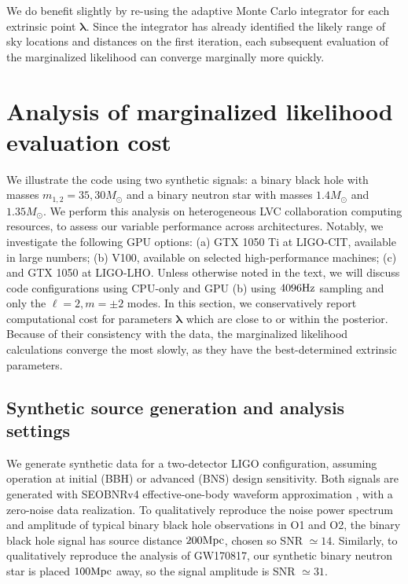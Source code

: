 \documentclass[twocolumn,prd,nofootinbib]{revtex4}
\newcommand\unit[1]{{\rm #1}}
\begin{document}
We do benefit slightly by re-using the adaptive Monte Carlo integrator for each extrinsic point $\bm{\lambda}$.  Since the
integrator has already identified the likely range of sky locations and distances on the first iteration, each
subsequent evaluation of the marginalized likelihood can converge marginally more quickly.



\section{Analysis of marginalized likelihood evaluation cost}
\label{sec:demo}

We illustrate the code using two synthetic signals: a binary black hole with masses $m_{1,2}=35,30 M_\odot$ and a binary
neutron star with masses $1.4 M_\odot$ and $1.35 M_\odot$.
 We perform this analysis on heterogeneous LVC collaboration computing resources, to assess our variable
performance across architectures.  Notably, we investigate the following GPU options: (a) GTX 1050 Ti at LIGO-CIT,
available in large numbers; (b) V100, available on selected high-performance machines; (c) and
GTX 1050 at LIGO-LHO.    Unless otherwise noted in the text, we will discuss code configurations using CPU-only and GPU (b) using
$4096\unit{Hz}$ sampling and only the  $\ell=2, m=\pm 2$ modes.  In this section, we  conservatively report computational cost for
parameters $\bm{\lambda}$ which are close to or within the posterior.  Because of their consistency with the data, 
the marginalized likelihood calculations converge the most slowly, as they have the best-determined extrinsic
parameters.


\subsection{Synthetic source generation and analysis settings}


We generate  synthetic data for a two-detector LIGO configuration, assuming operation at  initial (BBH) or advanced (BNS) design  sensitivity.
Both signals are generated with SEOBNRv4 effective-one-body waveform approximation \cite{2017PhRvD..95d4028B}, with a zero-noise data realization.   
To qualitatively reproduce the noise power spectrum and amplitude of typical binary black hole observations in O1 and
O2, the binary black hole signal has source distance $200 \unit{Mpc}$, chosen so SNR $\simeq 14$.  
Similarly, to qualitatively reproduce the analysis of GW170817, our synthetic binary neutron star is placed $100
\unit{Mpc}$ away, so the signal amplitude is SNR $\simeq 31$.
\end{document}
